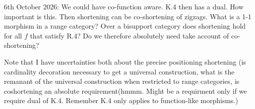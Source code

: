 \begin{aside}
6th October 2026: We could have co-function aware. K.4 then has a dual. How important is this. Then shortening can be co-shortening of zigzags. What is a 1-1 morphism in a range category? Over a bisupport category does shortening hold for all $f$ that satisfy R.4? Do we therefore absolutely need take account of co-shortening?

Note that I have uncertainties both about the precise positioning 
shortening (is cardinality decoration necessary to get a universal construction, what is the remanant of the universal construction when restricted to range categories, is coshortening an absolute requirement(hmmm. Might be a requirment only if we require dual of K.4. Remember K.4 only applies to function-like morphisms.)
\end{aside}
